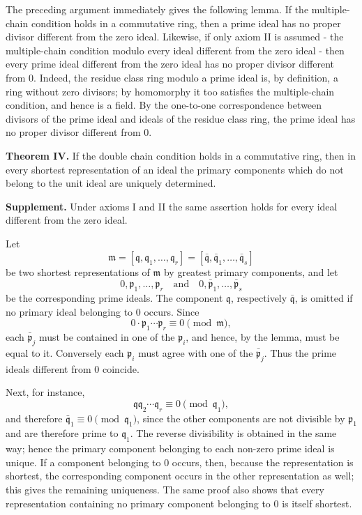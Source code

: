 \documentclass[
  12pt,
]{article}
\begin{document}
The preceding argument immediately gives the following lemma. If the
multiple-chain condition holds in a commutative ring, then a prime ideal
has no proper divisor different from the zero ideal. Likewise, if only
axiom II is assumed - the multiple-chain condition modulo every ideal
different from the zero ideal - then every prime ideal different from
the zero ideal has no proper divisor different from \(0\). Indeed, the
residue class ring modulo a prime ideal is, by definition, a ring
without zero divisors; by homomorphy it too satisfies the multiple-chain
condition, and hence is a field. By the one-to-one correspondence
between divisors of the prime ideal and ideals of the residue class
ring, the prime ideal has no proper divisor different from \(0\).

\textbf{Theorem IV.} If the double chain condition holds in a
commutative ring, then in every shortest representation of an ideal the
primary components which do not belong to the unit ideal are uniquely
determined.

\textbf{Supplement.} Under axioms I and II the same assertion holds for
every ideal different from the zero ideal.

Let \[
  \mathfrak m=[\mathfrak q,\mathfrak q_1,\ldots,\mathfrak q_r]
      =[\bar{\mathfrak q},\bar{\mathfrak q}_1,\ldots,\bar{\mathfrak q}_s]
\] be two shortest representations of \(\mathfrak m\) by greatest
primary components, and let \[
  0,\mathfrak p_1,\ldots,\mathfrak p_r
  \quad\text{and}\quad
  0,\bar{\mathfrak p}_1,\ldots,\bar{\mathfrak p}_s
\] be the corresponding prime ideals. The component \(\mathfrak q\),
respectively \(\bar{\mathfrak q}\), is omitted if no primary ideal
belonging to \(0\) occurs. Since \[
  0\cdot \mathfrak p_1\cdots\mathfrak p_r\equiv0\pmod{\mathfrak m},
\] each \(\bar{\mathfrak p}_j\) must be contained in one of the
\(\mathfrak p_i\), and hence, by the lemma, must be equal to it.
Conversely each \(\mathfrak p_i\) must agree with one of the
\(\bar{\mathfrak p}_j\). Thus the prime ideals different from \(0\)
coincide.

Next, for instance, \[
  \mathfrak q\mathfrak q_2
\cdots \mathfrak q_r\equiv0\pmod{\mathfrak q_1},
\] and therefore \(\bar{\mathfrak q}_1\equiv0\pmod{\mathfrak q_1}\),
since the other components are not divisible by \(\mathfrak p_1\) and
are therefore prime to \(\mathfrak q_1\). The reverse divisibility is
obtained in the same way; hence the primary component belonging to each
non-zero prime ideal is unique. If a component belonging to \(0\)
occurs, then, because the representation is shortest, the corresponding
component occurs in the other representation as well; this gives the
remaining uniqueness. The same proof also shows that every
representation containing no primary component belonging to \(0\) is
itself shortest.
\end{document}
